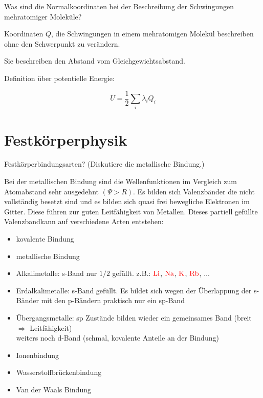 \documentclass[a5paper,12pt,ngerman,grid=front %
,print
]{kartei}
\let\oldce\ce
\renewcommand*{\ce}[1]{\begingroup\color{red}\oldce{#1}\endgroup}
\begin{document}
	\begin{karte}{
		Was sind die Normalkoordinaten bei der Beschreibung der Schwingungen mehratomiger Moleküle?
		}
		
		Koordinaten $Q$, die Schwingungen in einem mehratomigen Molekül beschreiben ohne den Schwerpunkt zu verändern.
		
		Sie beschreiben den Abstand vom Gleichgewichtsabstand.
		
		Definition über potentielle Energie:
		
		$$  U = \frac{1}{2} \sum_i \lambda_i Q_i  $$
		
	\end{karte}




\section*{Festkörperphysik}



	\begin{karte}{
		Festkörperbindungsarten? (Diskutiere die metallische Bindung.)
		}
		
		Bei der metallischen Bindung sind die Wellenfunktionen im Vergleich zum Atomabstand sehr ausgedehnt $( \Psi > R )$. Es bilden sich Valenzbänder die nicht vollständig besetzt sind und es bilden sich quasi frei bewegliche Elektronen im Gitter. Diese führen zur guten Leitfähigkeit von Metallen. Dieses partiell gefüllte Valenzbandkann auf verschiedene Arten entstehen:
		\begin{itemize}
			\item kovalente Bindung
			\item metallische Bindung
				\item Alkalimetalle:
					s-Band nur $1/2$ gefüllt. z.B.: $\ce{Li}$, $\ce{Na}$, $\ce{K}$, $\ce{Rb}$, $\dots$
				\item Erdalkalimetalle:
					s-Band gefüllt. Es bildet sich wegen der Überlappung der s-Bänder mit den p-Bändern praktisch nur ein sp-Band
				\item Übergangsmetalle:
					sp Zustände bilden wieder ein gemeinsames Band (breit $\Rightarrow$ Leitfähigkeit) \\
					weiters noch d-Band (schmal, kovalente Anteile an der Bindung)
			\item Ionenbindung
			\item Wasserstoffbrückenbindung
			\item Van der Waals Bindung
		\end{itemize}
			
	\end{karte}
\end{document}
